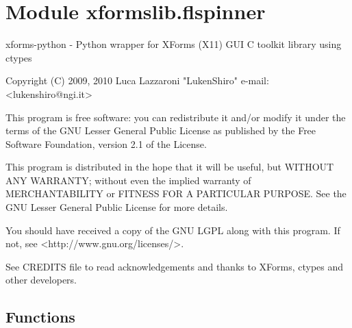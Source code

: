 %
%
%


\section{Module xformslib.flspinner}

    \label{xformslib:flspinner}
xforms-python - Python wrapper for XForms (X11) GUI C toolkit library using
ctypes

Copyright (C) 2009, 2010  Luca Lazzaroni "LukenShiro" e-mail: 
{\textless}lukenshiro@ngi.it{\textgreater}

This program is free software: you can redistribute it and/or modify it 
under the terms of the GNU Lesser General Public License as published by 
the Free Software Foundation, version 2.1 of the License.

This program is distributed in the hope that it will be useful, but WITHOUT
ANY WARRANTY; without even the implied warranty of MERCHANTABILITY or 
FITNESS FOR A PARTICULAR PURPOSE. See the GNU Lesser General Public License
for more details.

You should have received a copy of the GNU LGPL along with this program. If
not, see {\textless}http://www.gnu.org/licenses/{\textgreater}.

See CREDITS file to read acknowledgements and thanks to XForms, ctypes and 
other developers.



  \subsection{Functions}

    \label{xformslib:flspinner:fl_add_spinner}

